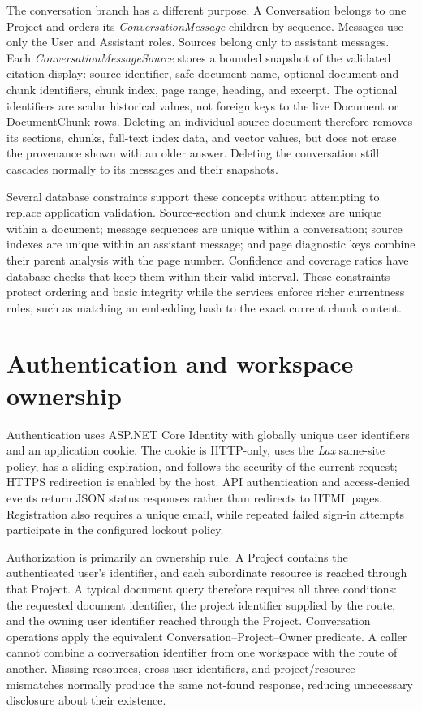 The conversation branch has a different purpose. A Conversation belongs to one
Project and orders its \emph{ConversationMessage} children by sequence.
Messages use only the User and Assistant roles. Sources belong only to
assistant messages. Each \emph{ConversationMessageSource} stores a bounded
snapshot of the validated citation display: source identifier, safe document
name, optional document and chunk identifiers, chunk index, page range,
heading, and excerpt. The optional identifiers are scalar historical values,
not foreign keys to the live Document or DocumentChunk rows. Deleting an
individual source document therefore removes its sections, chunks, full-text
index data, and vector values, but does not erase the provenance shown with an
older answer. Deleting the conversation still cascades normally to its
messages and their snapshots.

Several database constraints support these concepts without attempting to
replace application validation. Source-section and chunk indexes are unique
within a document; message sequences are unique within a conversation; source
indexes are unique within an assistant message; and page diagnostic keys
combine their parent analysis with the page number. Confidence and coverage
ratios have database checks that keep them within their valid interval. These
constraints protect ordering and basic integrity while the services enforce
richer currentness rules, such as matching an embedding hash to the exact
current chunk content.

\section{Authentication and workspace ownership}
\label{sec:authentication-ownership}

Authentication uses ASP.NET Core Identity with globally unique user
identifiers and an application cookie.
The cookie is HTTP-only, uses the \emph{Lax} same-site policy, has a sliding
expiration, and follows the security of the current request; HTTPS redirection
is enabled by the host. API authentication and access-denied events return JSON
status responses rather than redirects to HTML pages. Registration also
requires a unique email, while repeated failed sign-in attempts participate in
the configured lockout policy.

Authorization is primarily an ownership rule. A Project contains the
authenticated user's identifier, and each subordinate resource is reached
through that Project. A typical document query therefore requires all three
conditions: the requested document identifier, the project identifier supplied
by the route, and the owning user identifier reached through the Project.
Conversation operations apply the equivalent
Conversation--Project--Owner predicate. A caller cannot combine a conversation
identifier from one workspace with the route of another. Missing resources,
cross-user identifiers, and project/resource mismatches normally produce the
same not-found response, reducing unnecessary disclosure about their
existence.

